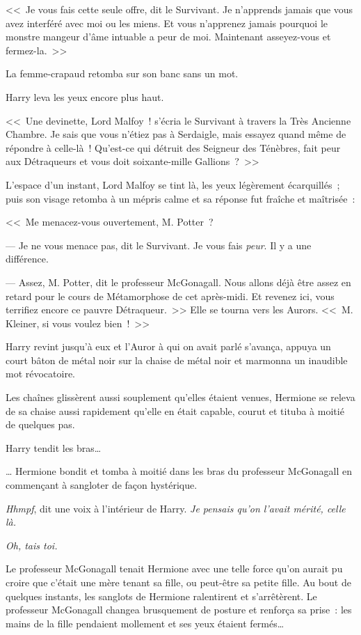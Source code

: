 <<~Je vous fais cette seule offre, dit le Survivant. Je n'apprends jamais que vous avez interféré avec moi ou les miens. Et vous n'apprenez jamais pourquoi le monstre mangeur d'âme intuable a peur de moi. Maintenant asseyez-vous et fermez-la.~>>

La femme-crapaud retomba sur son banc sans un mot.

Harry leva les yeux encore plus haut.

<<~Une devinette, Lord Malfoy~! s'écria le Survivant à travers la Très Ancienne Chambre. Je sais que vous n'étiez pas à Serdaigle, mais essayez quand même de répondre à celle-là~! Qu'est-ce qui détruit des Seigneur des Ténèbres, fait peur aux Détraqueurs et vous doit soixante-mille Gallions~?~>>

L'espace d'un instant, Lord Malfoy se tint là, les yeux légèrement écarquillés~; puis son visage retomba à un mépris calme et sa réponse fut fraîche et maîtrisée~:

<<~Me menacez-vous ouvertement, M. Potter~?

--- Je ne vous menace pas, dit le Survivant. Je vous fais \emph{peur}. Il y a une différence.

--- Assez, M. Potter, dit le professeur McGonagall. Nous allons déjà être assez en retard pour le cours de Métamorphose de cet après-midi. Et revenez ici, vous terrifiez encore ce pauvre Détraqueur.~>> Elle se tourna vers les Aurors. <<~M. Kleiner, si vous voulez bien~!~>>

Harry revint jusqu'à eux et l'Auror à qui on avait parlé s'avança, appuya un court bâton de métal noir sur la chaise de métal noir et marmonna un inaudible mot révocatoire.

Les chaînes glissèrent aussi souplement qu'elles étaient venues, Hermione se releva de sa chaise aussi rapidement qu'elle en était capable, courut et tituba à moitié de quelques pas.

Harry tendit les bras…

… Hermione bondit et tomba à moitié dans les bras du professeur McGonagall en commençant à sangloter de façon hystérique.

\emph{Hhmpf}, dit une voix à l'intérieur de Harry. \emph{Je pensais qu'on l'avait mérité, celle là.}

\emph{Oh, tais toi.}

Le professeur McGonagall tenait Hermione avec une telle force qu'on aurait pu croire que c'était une mère tenant sa fille, ou peut-être sa petite fille. Au bout de quelques instants, les sanglots de Hermione ralentirent et s'arrêtèrent. Le professeur McGonagall changea brusquement de posture et renforça sa prise~: les mains de la fille pendaient mollement et ses yeux étaient fermés…

